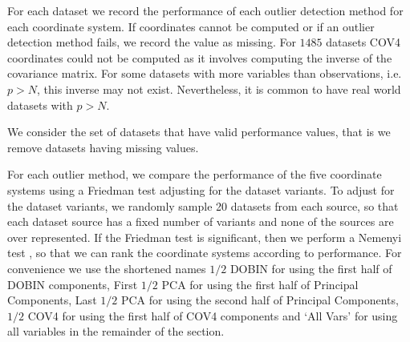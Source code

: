 \documentclass[letter,12pt]{article}
\begin{document}
{\color{blue} For each dataset we record the performance of each outlier detection method for each coordinate system. If coordinates cannot be computed or if an outlier detection method fails, we record the value as missing. For $1485$ datasets COV4 coordinates could not be computed as it involves computing the inverse of the covariance matrix. For some datasets with more variables than observations, i.e. $p > N$, this inverse may not exist.  Nevertheless, it is common to have real world datasets with $p > N$.

We consider the set of datasets that have valid performance values, that is we remove datasets having missing values.}  For each outlier method, we compare the performance of the {\color{blue}five} coordinate systems using a Friedman test adjusting for the dataset variants. To adjust for the dataset variants, we {\color{blue} randomly sample 20 datasets from each source, so that each dataset source has a fixed number of variants and none of the sources are over represented}. If the Friedman test is significant, then we perform a Nemenyi test {\color{blue} \citep{hollander2013nonparametric}}, so that we can rank the coordinate systems according to performance. For convenience we use the shortened names $1/2$ DOBIN for using the first half of DOBIN components, First $1/2$ PCA for using the first half of Principal Components, {\color{blue} Last $1/2$ PCA for using the second half of Principal Components, $1/2$ COV4 for using the first half of COV4 components }  and `All Vars' for using all variables in the remainder of the section.
\end{document}
